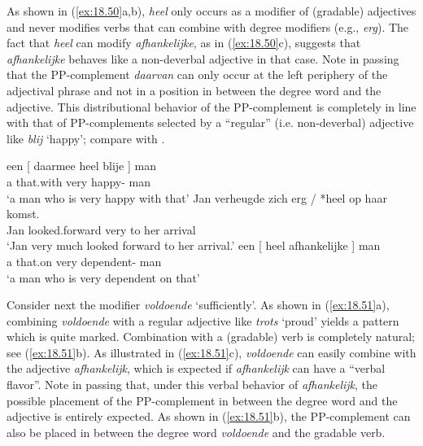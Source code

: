 \documentclass[output=paper]{langsci/langscibook}
\begin{document}
As shown in (\ref{ex:18.50}a,b), \emph{heel} only occurs as a modifier of
(gradable) adjectives and never modifies verbs that can combine with degree
modifiers (e.g., \emph{erg}). The fact that \emph{heel} can modify
\emph{afhankelijke}, as in (\ref{ex:18.50}c), suggests that \emph{afhankelijke}
behaves like a non-deverbal adjective in that case. Note in passing that the
PP-complement \emph{daarvan} can only occur at the left periphery of the
adjectival phrase and not in a position in between the degree word and the
adjective. This distributional behavior of the PP-complement is completely in
line with that of PP-complements selected by a \enquote{regular} (i.e.
non-deverbal) adjective like \emph{blij} \enquote*{happy}; compare with
.

\ea%
    \label{ex:18.50}
	\ea
	\gll een [ daarmee heel blije ] man\\
    a {} that.with very happy-\Agr{} {} man\\
	\glt \enquote*{a man who is very happy with that}
	\ex
    \gll Jan verheugde zich {erg / *heel} op haar komst.\\
        Jan looked.forward \Refl{} very to her arrival\\
	\glt \enquote*{Jan very much looked forward to her arrival.}
	\ex
	\gll een [  heel  afhankelijke ] man\\
        a {} that.on very {} dependent-\Agr{} {} man\\
	\glt \enquote*{a man who is very dependent on that}
	\z
\z

Consider next the modifier \emph{voldoende} \enquote*{sufficiently}. As shown
in (\ref{ex:18.51}a), combining \emph{voldoende} with a regular adjective like
\emph{trots} \enquote*{proud} yields a pattern which is quite marked.
Combination with a (gradable) verb is completely natural; see (\ref{ex:18.51}b).
As illustrated in (\ref{ex:18.51}c), \emph{voldoende} can easily combine with
the adjective \emph{afhankelijk}, which is expected if \emph{afhankelijk} can
have a \enquote{verbal flavor}. Note in passing that, under this verbal
behavior of \emph{afhankelijk}, the possible placement of the PP-complement in
between the degree word and the adjective is entirely expected. As shown in
(\ref{ex:18.51}b), the PP-complement can also be placed in between the degree
word \emph{voldoende} and the gradable verb.
\end{document}
